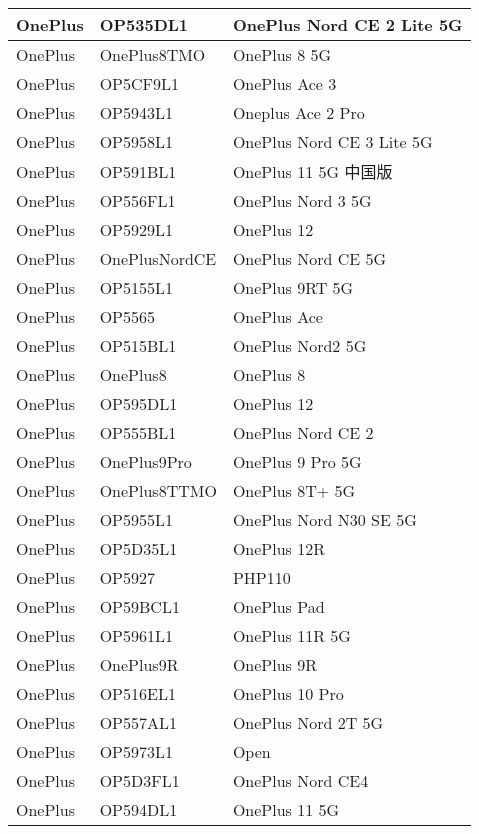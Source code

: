\begin{tabularx}{\linewidth}{|l|X|X|}
        OnePlus & OP535DL1 & OnePlus Nord CE 2 Lite 5G \\ \hline
        OnePlus & OnePlus8TMO & OnePlus 8 5G \\ \hline
        OnePlus & OP5CF9L1 & OnePlus Ace 3 \\ \hline
        OnePlus & OP5943L1 & Oneplus Ace 2 Pro \\ \hline
        OnePlus & OP5958L1 & OnePlus Nord CE 3 Lite 5G \\ \hline
        OnePlus & OP591BL1 & OnePlus 11 5G 中国版 \\ \hline
        OnePlus & OP556FL1 & OnePlus Nord 3 5G \\ \hline
        OnePlus & OP5929L1 & OnePlus 12 \\ \hline
        OnePlus & OnePlusNordCE & OnePlus Nord CE 5G \\ \hline
        OnePlus & OP5155L1 & OnePlus 9RT 5G \\ \hline
        OnePlus & OP5565 & OnePlus Ace \\ \hline
        OnePlus & OP515BL1 & OnePlus Nord2 5G \\ \hline
        OnePlus & OnePlus8 & OnePlus 8 \\ \hline
        OnePlus & OP595DL1 & OnePlus 12 \\ \hline
        OnePlus & OP555BL1 & OnePlus Nord CE 2 \\ \hline
        OnePlus & OnePlus9Pro & OnePlus 9 Pro 5G \\ \hline
        OnePlus & OnePlus8TTMO & OnePlus 8T+ 5G \\ \hline
        OnePlus & OP5955L1 & OnePlus Nord N30 SE 5G \\ \hline
        OnePlus & OP5D35L1 & OnePlus 12R \\ \hline
        OnePlus & OP5927 & PHP110 \\ \hline
        OnePlus & OP59BCL1 & OnePlus Pad \\ \hline
        OnePlus & OP5961L1 & OnePlus 11R 5G \\ \hline
        OnePlus & OnePlus9R & OnePlus 9R \\ \hline
        OnePlus & OP516EL1 & OnePlus 10 Pro \\ \hline
        OnePlus & OP557AL1 & OnePlus Nord 2T 5G \\ \hline
        OnePlus & OP5973L1 & Open \\ \hline
        OnePlus & OP5D3FL1 & OnePlus Nord CE4 \\ \hline
        OnePlus & OP594DL1 & OnePlus 11 5G \\ \hline

\end{tabularx}
